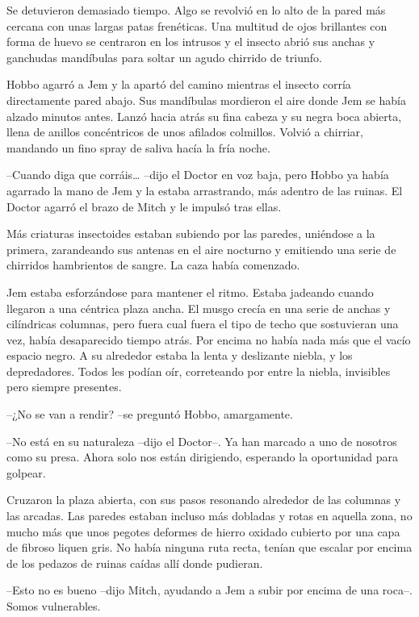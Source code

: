 {Se detuvieron demasiado tiempo. Algo se revolvió en lo alto de la pared
 más cercana con unas largas patas frenéticas. Una multitud de ojos
 brillantes con forma de huevo se centraron en los intrusos y el insecto
 abrió sus anchas y ganchudas mandíbulas para soltar un agudo chirrido de
triunfo.}

{Hobbo agarró a Jem y la apartó del camino mientras el insecto corría
 directamente pared abajo. Sus mandíbulas mordieron el aire donde Jem se
 había alzado minutos antes. Lanzó hacia atrás su fina cabeza y su negra
 boca abierta, llena de anillos concéntricos de unos afilados colmillos.
 Volvió a chirriar, mandando un fino spray de saliva hacía la fría
noche.}

{--Cuando diga que corráis\ldots{} --dijo el Doctor en voz baja, pero
 Hobbo ya había agarrado la mano de Jem y la estaba arrastrando, más
 adentro de las ruinas. El Doctor agarró el brazo de Mitch y le impulsó
tras ellas.}

{Más criaturas insectoides estaban subiendo por las paredes, uniéndose a
 la primera, zarandeando sus antenas en el aire nocturno y emitiendo una
serie de chirridos hambrientos de sangre. La caza había comenzado.}

{Jem estaba esforzándose para mantener el ritmo. Estaba jadeando cuando
 llegaron a una céntrica plaza ancha. El musgo crecía en una serie de
 anchas y cilíndricas columnas, pero fuera cual fuera el tipo de techo
 que sostuvieran una vez, había desaparecido tiempo atrás. Por encima no
 había nada más que el vacío espacio negro. A su alrededor estaba la
 lenta y deslizante niebla, y los depredadores. Todos les podían oír,
correteando por entre la niebla, invisibles pero siempre presentes.}

{--¿No se van a rendir? --se preguntó Hobbo, amargamente.}

{--No está en su naturaleza --dijo el Doctor--. Ya han marcado a uno de
 nosotros como su presa. Ahora solo nos están dirigiendo, esperando la
oportunidad para golpear.}

{Cruzaron la plaza abierta, con sus pasos resonando alrededor de las
 columnas y las arcadas. Las paredes estaban incluso más dobladas y rotas
 en aquella zona, no mucho más que unos pegotes deformes de hierro
 oxidado cubierto por una capa de fibroso liquen gris. No había ninguna
 ruta recta, tenían que escalar por encima de los pedazos de ruinas
caídas allí donde pudieran.}

{--Esto no es bueno --dijo Mitch, ayudando a Jem a subir por encima de
una roca--. Somos vulnerables.}

